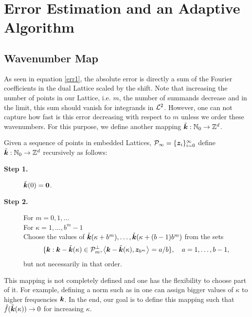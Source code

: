 \documentclass[graybox]{svmult}
\newcommand{\Z}{\mathbb{Z}} %
\newcommand{\N}{\mathbb{N}} %
\newcommand{\bszero}{\boldsymbol{0}} %
\newcommand{\bsz}{\boldsymbol{z}}    %
\begin{document}
\section{Error Estimation and an Adaptive Algorithm}\label{secalgo}

\subsection{Wavenumber Map}

As seen in equation \eqref{err1}, the absolute error is directly a sum of the Fourier coefficients in the dual Lattice scaled by the shift. Note that increasing the number of points in our Lattice, i.e. $m$, the number of summands decrease and in the limit, this sum should vanish for integrands in $\mathcal{L}^2$. However, one can not capture how fast is this error decreasing with respect to $m$ unless we order these wavenumbers. For this purpose, we define another mapping $\tvk: \N_0 \to \Z^d$.

\begin{definition} \label{wavenummapdef} Given a sequence of points in embedded Lattices, $\cp_{\infty} = \{\bsz_i\}_{i=0}^{\infty}$ define $\tvk: \N_0 \to \Z^d$ recursively as follows:
\begin{description}
\item[\textbf{Step 1.}] $\tvk(0)=\bszero$.

\item[\textbf{Step 2.}] For $m=0, 1, \ldots$ \\
\hspace*{1.3cm} For $\kappa = 1, \ldots, b^{m} -1 $ \\
\hspace*{1.6cm} Choose the values of $\tilde{\boldsymbol{k}}(\kappa+b^{m}), \ldots, \tilde{\boldsymbol{k}}(\kappa+(b-1)b^{m})$ from the sets
\[
\{\bsk : \bsk - \tvk(\kappa) \in \cp_{m}^{\perp}, \ip{\bsk - \tvk(\kappa)}{\bsz_{b^m}}=a/b \}, \quad a=1, \ldots, b-1,
\]
\hspace*{1.6cm} but not necessarily in that order.
\end{description}
\end{definition}

This mapping is not completely defined and one has the flexibility to choose part of it. For example, defining a norm such as in \cite[Chap. 4]{SloJoe94} one can assign bigger values of $\kappa$ to higher frequencies $\boldsymbol{k}$. In the end, our goal is to define this mapping such that $\hat{f}(\tilde{\boldsymbol{k}}(\kappa))\rightarrow 0$ for increasing $\kappa$.
\end{document}
